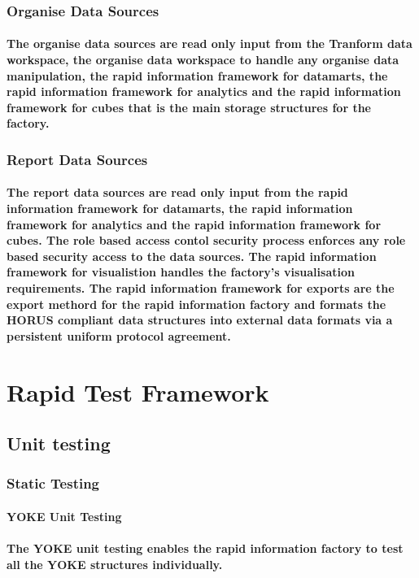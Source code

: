 \documentclass{acm_proc_article-sp}
\begin{document}
\subsubsection{Organise Data Sources}
\paragraph{The organise data sources are read only input from the Tranform data workspace, the organise data workspace to handle any organise data manipulation, the rapid information framework for datamarts, the rapid information framework for analytics and the rapid information framework for cubes that is the main storage structures for the factory.}
\subsubsection{Report Data Sources}
\paragraph{The report data sources are read only input from the rapid information framework for datamarts, the rapid information framework for analytics and the rapid information framework for cubes. The role based access contol security process enforces any role based security access to the data sources. The rapid information framework for visualistion handles the factory's visualisation requirements. The rapid information framework for exports are the export methord for the rapid information factory and formats the HORUS compliant data structures into external data formats via a persistent uniform protocol agreement.}
\pagebreak
\section{Rapid Test Framework}
\subsection{Unit testing}
\subsubsection{Static Testing}
\paragraph{YOKE Unit Testing}
\paragraph{The YOKE unit testing enables the rapid information factory to test all the YOKE structures individually.}
\end{document}
